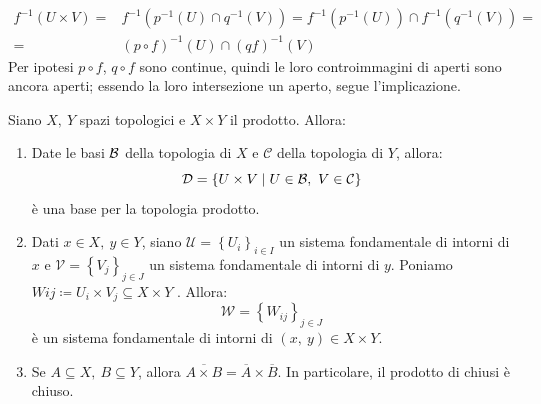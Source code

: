 \begin{demonstration}
\begin{enumerate}[label=\Roman*]
\begin{align*}
f^{-1}\left(U\times V\right)=&f^{-1}\left(p^{-1}\left(U\right)\cap q^{-1}\left(V\right)\right)=f^{-1}\left(p^{-1}\left(U\right)\right)\cap f^{-1}\left(q^{-1}\left(V\right)\right)= \\
=& \left(p\circ f\right)^{-1}\left(U\right)\cap \left(qf\right)^{-1}\left(V\right)
\end{align*}
Per ipotesi $p\circ f$, $q\circ f$ sono continue, quindi le loro controimmagini di aperti sono ancora aperti; essendo la loro intersezione un aperto, segue l'implicazione.
\end{enumerate}
\end{demonstration}
\begin{proposition}
Siano $X,\ Y$ spazi topologici e $X\times Y$ il prodotto. Allora:
\begin{enumerate}
\item Date le basi $\mathcal{B}$ della topologia di $X$ e $\mathcal{C}$ della topologia di $Y$, allora:
\begin{equation}
\mathcal{D}=\left\{U\times V\mid U\in\mathcal{B},\ V\in\mathcal{C}\right\}
\end{equation}
è una base per la topologia prodotto.
\item Dati $x\in X,\ y\in Y$, siano $\mathcal{U} = \left\{U_i\right\}_{i\in I}$ un
sistema fondamentale di intorni di $x$ e $\mathcal{V} = \left\{V_j\right\}_{j\in J}$ un sistema fondamentale di intorni di $y$. Poniamo $Wij \coloneqq U_i \times V_j \subseteq X \times Y$ . Allora:
\begin{equation}
\mathcal{W} = \left\{W_{ij}\right\}_{j\in J}
\end{equation}
è un sistema fondamentale di intorni di $\left(x,\ y\right) \in X \times Y$.
\item Se $A\subseteq X,\ B\subseteq Y$, allora $\overline{A\times B}=\overline{A}\times \overline{B}$. In particolare, il prodotto di chiusi è chiuso.
\end{enumerate}
\vspace{-3mm}
\end{proposition}
